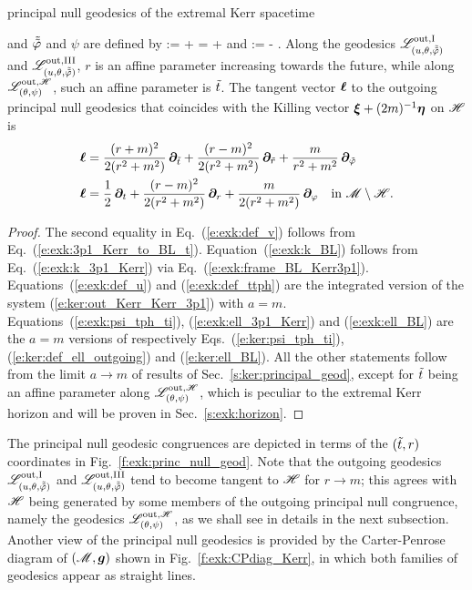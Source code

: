\begin{tprop}{principal null geodesics of the extremal Kerr spacetime}{}
\begin{itemize}
\ee
and $\tilde{{\tilde\varphi}}$ and $\psi$ are defined by
\be \label{e:exk:def_ttph}
    \tilde{\tph} := \tph +  = \ph + 
\ee
and
\be \label{e:exk:psi_tph_ti}
    \psi := \tph -  .
\ee
Along the geodesics $\mathscr{L}^{\rm out, I}_{(u,\theta,\tilde{{\tilde\varphi}})}$ and $\mathscr{L}^{\rm out, III}_{(u,\theta,\tilde{{\tilde\varphi}})}$,
$r$ is an affine parameter increasing towards the future,
while along $\mathscr{L}^{{\rm out},\mathscr{H}}_{(\theta,\psi)}$, such an affine parameter is ${\tilde t}$. The tangent vector $\bm{\ell}$ to the outgoing principal null geodesics
that coincides with the Killing vector $\bm{\xi} + (2m)^{-1} \bm{\eta}$ on $\mathscr{H}$ is
\begin{subequations}
\begin{align}
 \bm{\ell} & = \frac{(r + m)^2}{2(r^2 + m^2)}\, \bm{\partial}_{{\tilde t}}
  + \frac{(r - m)^2}{2(r^2 + m^2)} \,  \bm{\partial}_{\tilde{r}}
  + \frac{m}{r^2 + m^2} \, \bm{\partial}_{{\tilde\varphi}} \label{e:exk:ell_3p1_Kerr}\\
 \bm{\ell} & =  \frac{1}{2}\, \bm{\partial}_t
            + \frac{(r - m)^2}{2(r^2 + m^2)} \,  \bm{\partial}_r
            + \frac{m}{2(r^2 + m^2)} \, \bm{\partial}_\varphi
            \quad \mbox{in}\ \mathscr{M}\setminus\mathscr{H} . \label{e:exk:ell_BL}
\end{align}
\end{subequations}
\end{itemize}
\end{tprop}

\begin{proof}
The second equality in Eq.~(\ref{e:exk:def_v}) follows from Eq.~(\ref{e:exk:3p1_Kerr_to_BL_t}).
Equation~(\ref{e:exk:k_BL}) follows from Eq.~(\ref{e:exk:k_3p1_Kerr}) via Eq.~(\ref{e:exk:frame_BL_Kerr3p1}).
Equations~(\ref{e:exk:def_u}) and (\ref{e:exk:def_ttph}) are the integrated version of the system (\ref{e:ker:out_Kerr_Kerr_3p1}) with $a=m$. Equations~(\ref{e:exk:psi_tph_ti}), (\ref{e:exk:ell_3p1_Kerr})
and (\ref{e:exk:ell_BL}) are the $a=m$ versions of respectively
Eqs.~(\ref{e:ker:psi_tph_ti}), (\ref{e:ker:def_ell_outgoing}) and (\ref{e:ker:ell_BL}).
All the other statements follow from the limit $a\to m$ of results of Sec.~\ref{s:ker:principal_geod},
except for ${\tilde t}$ being an affine parameter along $\mathscr{L}^{{\rm out},\mathscr{H}}_{(\theta,\psi)}$, which
is peculiar to the extremal Kerr horizon and will
be proven in Sec.~\ref{s:exk:horizon}.
\end{proof}

The principal null geodesic congruences are depicted in terms of the $({\tilde t}, r)$
coordinates in Fig.~\ref{f:exk:princ_null_geod}. Note that the outgoing geodesics
$\mathscr{L}^{\rm out, I}_{(u,\theta,\tilde{{\tilde\varphi}})}$ and $\mathscr{L}^{\rm out, III}_{(u,\theta,\tilde{{\tilde\varphi}})}$
tend to become tangent to $\mathscr{H}$ for $r\to m$; this agrees with $\mathscr{H}$ being
generated by some members of the outgoing principal null congruence, namely the geodesics
$\mathscr{L}^{{\rm out},\mathscr{H}}_{(\theta,\psi)}$, as we shall see in details in the next subsection.
Another view of the principal null geodesics is provided by the Carter-Penrose
diagram of $(\mathscr{M},\bm{g})$ shown in Fig.~\ref{f:exk:CPdiag_Kerr}, in which both
families of geodesics appear as straight lines.

